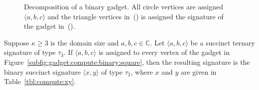 \documentclass[11pt]{article}
\def\borderColor{blue!60}
\def\scale{0.6}
\def\nodeDist{1.4cm}
\begin{document}
\begin{figure}[ht]
{
 }
 \caption{Decomposition of a binary gadget.
 All circle vertices are assigned $\langle a,b,c \rangle$
 and the triangle vertices in~()
 is assigned the signature of the gadget in~().}
 \label{fig:gadget:compute:binary:square_construction}
\end{figure}

\begin{lemma} \label{lem:compute:binary:square:construction}
 Suppose $\kappa \ge 3$ is the domain size and $a,b,c \in \mathbb{C}$.
 Let $\langle a,b,c \rangle$ be a succinct ternary signature of type $\tau_3$.
 If $\langle a,b,c \rangle$ is assigned to every vertex of the gadget in Figure~\ref{subfig:gadget:compute:binary:square},
 then the resulting signature is the binary succinct signature $\langle x,y \rangle$ of type $\tau_2$,
 where $x$ and $y$ are given in Table~\ref{tbl:compute:xy}.
\end{lemma}
\end{document}
